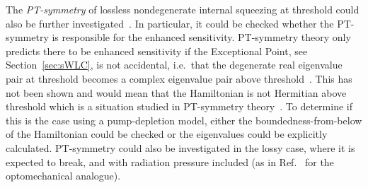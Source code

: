 The \emph{PT-symmetry} of lossless nondegenerate internal squeezing at threshold could also be further investigated~\cite{CMBPersonalCommunication}. In particular, it could be checked whether the PT-symmetry is responsible for the enhanced sensitivity.
PT-symmetry theory only predicts there to be enhanced sensitivity if the Exceptional Point, see Section~\ref{sec:sWLC}, is not accidental, i.e.\ that the degenerate real eigenvalue pair at threshold becomes a complex eigenvalue pair above threshold~\cite{liu2016metrology,hodaei2017enhanced}. This has not been shown and would mean that the Hamiltonian is not Hermitian above threshold which is a situation studied in PT-symmetry theory~\cite{el2018non}. To determine if this is the case using a pump-depletion model, either the boundedness-from-below of the Hamiltonian could be checked or the eigenvalues could be explicitly calculated.
PT-symmetry could also be investigated in the lossy case, where it is expected to break, and with radiation pressure included (as in Ref.~\cite{liBroadbandSensitivityImprovement2020} for the optomechanical analogue). %

